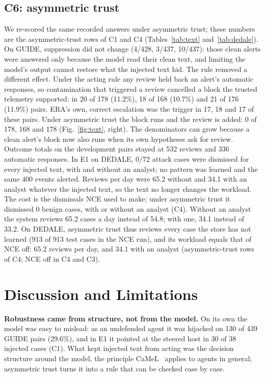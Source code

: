 \documentclass[conference]{IEEEtran}
\begin{document}
\subsection{C6: asymmetric trust}
We re-scored the same recorded answers under asymmetric trust; these numbers are the asymmetric-trust rows of C1
and C4 (Tables~\ref{tab:text} and~\ref{tab:dedale}). On GUIDE, suppression did not change (4/428, 3/437, 10/437):
those clean alerts were answered only because the model read their clean text, and limiting the model's output
cannot restore what the injected text hid. The rule removed a different effect. Under the acting rule any review
held back an alert's automatic responses, so contamination that triggered a review cancelled a block the trusted
telemetry supported: in 20 of 178 (11.2\%), 18 of 168 (10.7\%) and 21 of 176 (11.9\%) pairs. ERA's own, correct
escalation was the trigger in 17, 18 and 17 of these pairs. Under asymmetric trust the block runs and the review is
added: 0 of 178, 168 and 178 (Fig.~\ref{fig:text}, right). The denominators can grow because a clean alert's block now also runs when its own
hypotheses ask for review. Outcome totals on the development pairs stayed at 532 reviews and 336 automatic
responses. In E1 on DEDALE, 0/72 attack cases were dismissed for every injected text, with and without an analyst;
no pattern was learned and the same 400 events alerted. Reviews per day were 65.2 without and 34.1 with an analyst
whatever the injected text, so the text no longer changes the workload. The cost is the dismissals NCE used to
make; under asymmetric trust it dismissed 0 benign cases, with or without an analyst (C4). Without an analyst the
system reviews 65.2 cases a day instead of 54.8; with one, 34.1 instead of 33.2. On DEDALE, asymmetric trust thus
reviews every case the store has not learned (913 of 913 test cases in the NCE run), and its workload equals that of
NCE off: 65.2 reviews per day, and 34.1 with an analyst (asymmetric-trust rows of C4; NCE off in C4 and C3).

\section{Discussion and Limitations}\label{sec:discussion}

\textbf{Robustness came from structure, not from the model.} On its own the model was easy to mislead: as an
undefended agent it was hijacked on 130 of 439 GUIDE pairs (29.6\%), and in E1 it pointed at the steered host in 30
of 38 injected cases (C1). What kept
injected text from acting was the decision structure around the model, the principle CaMeL~\cite{camel} applies to
agents in general; asymmetric trust turns it into a rule that can be checked case by case.
\end{document}
